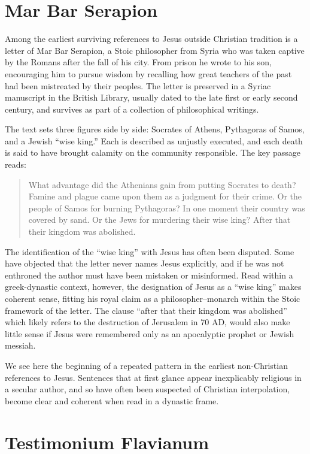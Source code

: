 \section{Mar Bar Serapion}\label{sec:mar-bar-serapion}

Among the earliest surviving references to Jesus outside Christian tradition is a letter of Mar Bar Serapion, a Stoic philosopher from Syria who was taken captive by the Romans after the fall of his city.
From prison he wrote to his son, encouraging him to pursue wisdom by recalling how great teachers of the past had been mistreated by their peoples.
The letter is preserved in a Syriac manuscript in the British Library, usually dated to the late first or early second century, and survives as part of a collection of philosophical writings.

The text sets three figures side by side: Socrates of Athens, Pythagoras of Samos, and a Jewish “wise king.”
Each is described as unjustly executed, and each death is said to have brought calamity on the community responsible.
The key passage reads:
\begin{quote}
    What advantage did the Athenians gain from putting Socrates to death?
    Famine and plague came upon them as a judgment for their crime.
    Or the people of Samos for burning Pythagoras?
    In one moment their country was covered by sand.
    Or the Jews for murdering their wise king?
    After that their kingdom was abolished.
\end{quote}

The identification of the “wise king” with Jesus has often been disputed.
Some have objected that the letter never names Jesus explicitly, and if he was not enthroned the author must have been mistaken or misinformed.
Read within a greek-dynastic context, however, the designation of Jesus as a “wise king” makes coherent sense, fitting his royal claim as a philosopher–monarch within the Stoic framework of the letter.
The clause “after that their kingdom was abolished” which likely refers to the destruction of Jerusalem in 70 AD, would also make little sense if Jesus were remembered only as an apocalyptic prophet or Jewish messiah.


We see here the beginning of a repeated pattern in the earliest non-Christian references to Jesus.
Sentences that at first glance appear inexplicably religious in a secular author, and so have often been suspected of Christian interpolation, become clear and coherent when read in a dynastic frame.

\section{Testimonium Flavianum}\label{sec:testimonium-flavianum}

